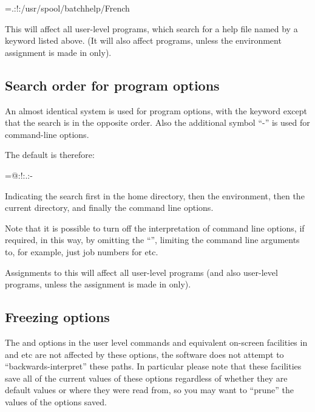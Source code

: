 \begin{expara}

\helppathvarname={\textquotedbl}.:!:/usr/spool/batchhelp/French{\textquotedbl}

\end{expara}

This will affect all \ProductName{} user-level programs, which search for a help file named by a keyword listed above. (It will also affect \OtherProductName{} programs, unless the environment assignment is made in \masterconfig{} only).

\subsection{Search order for program options}
An almost identical system is used for program options, with the keyword \configpathvar{} except that the search is in the
opposite order. Also the additional symbol ``-'' is used for command-line options.

The default is therefore:

\begin{expara}

\configpathvarname={\textquotedbl}@{}:!:.:-{\textquotedbl}

\end{expara}

Indicating the search first in the home directory, then the environment, then the current directory, and finally the command line options.

Note that it is possible to turn off the interpretation of command line options, if required, in this way, by omitting the
``\exampletext{{}-}'', limiting the command line arguments to, for example, just job numbers for \PrBtjchange{} etc.

Assignments to this will affect all \ProductName{} user-level programs (and also \OtherProductName{} user-level programs,
unless the assignment is made in \masterconfig only).

\subsection{Freezing options}
The  and  options in the user level commands and equivalent on-screen facilities
in \PrBtq{} and \PrXmbtq{} etc are not affected by these options, the software does not attempt to ``backwards-interpret'' these paths. In
particular please note that these facilities save all of the current values of these options regardless of whether they are default values
or where they were read from, so you may want to ``prune'' the values of the options saved.

